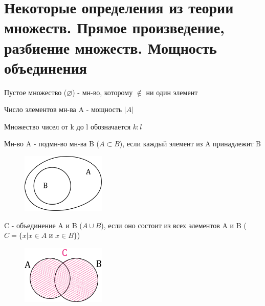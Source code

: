 \documentclass[discrete.tex]{subfiles}
\begin{document}
  \section{Некоторые определения из теории множеств. Прямое произведение, разбиение множеств. Мощность объединения}

  \begin{definition}
    Пустое множество ($\varnothing$) - мн-во, которому $\nin$ ни один элемент
  \end{definition}

  \begin{definition}
    Число элементов мн-ва A - мощность $|A|$
  \end{definition}

  \begin{definition}
    Множество чисел от k до l обозначается $k:l$
  \end{definition}

  \begin{definition}
    Мн-во A - подмн-во мн-ва B ($A \subset B$), если каждый элемент из A принадлежит B
    \begin{figure}[H]
        \includegraphics[width=4cm]{pics/1_1.png}
        \centering
    \end{figure}
  \end{definition}

  \begin{definition}
    C - объединение A и B ($A \cup B$), если оно состоит из всех элементов A и B ($C = \{x | x \in A \text{ и } x \in B\}$)
    \begin{figure}[H]
        \includegraphics[width=4cm]{pics/1_2.png}
        \centering
    \end{figure}
  \end{definition}
\end{document}
